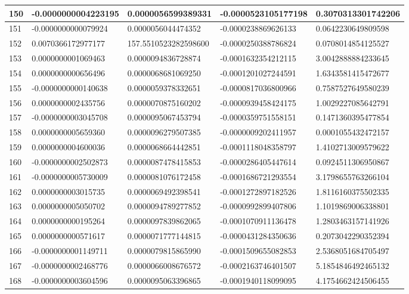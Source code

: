 \begin{center}
\begin{longtable}{|p{0.5cm}|p{3.5cm}|p{3.5cm}|p{3.5cm}|p{3.5cm}|}
\hline
150  & -0.0000000004223195  & 0.0000056599389331  & -0.0000523105177198  & 0.3070313301742206\\
\hline
151  & -0.0000000000079924  & 0.0000056044474352  & -0.0000238869626133  & 0.0642230649809598\\
\hline
152  & 0.0070366172977177  & 157.5510523282598600  & -0.0000250388786824  & 0.0708014854125527\\
\hline
153  & 0.0000000001069463  & 0.0000094836728874  & -0.0001632354212115  & 3.0042888884233645\\
\hline
154  & 0.0000000000656496  & 0.0000068681069250  & -0.0001201027244591  & 1.6343581415472677\\
\hline
155  & -0.0000000000140638  & 0.0000059378332651  & -0.0000817036800966  & 0.7587527649580239\\
\hline
156  & 0.0000000002435756  & 0.0000070875160202  & -0.0000939458424175  & 1.0029227085642791\\
\hline
157  & -0.0000000003045708  & 0.0000095067453794  & -0.0000359751558151  & 0.1471360395477854\\
\hline
158  & 0.0000000005659360  & 0.0000096279507385  & -0.0000009202411957  & 0.0001055432472157\\
\hline
159  & 0.0000000004600036  & 0.0000068664442851  & -0.0001118048358797  & 1.4102713009579622\\
\hline
160  & -0.0000000002502873  & 0.0000087478415853  & -0.0000286405447614  & 0.0924511306950867\\
\hline
161  & -0.0000000005730009  & 0.0000081076172458  & -0.0001686721293554  & 3.1798655763266104\\
\hline
162  & 0.0000000003015735  & 0.0000069492398541  & -0.0001272897182526  & 1.8116160375502335\\
\hline
163  & 0.0000000005050702  & 0.0000094789277852  & -0.0000992899407806  & 1.1019869006338801\\
\hline
164  & 0.0000000000195264  & 0.0000097839862065  & -0.0001070911136478  & 1.2803463157141926\\
\hline
165  & 0.0000000000571617  & 0.0000071777144815  & -0.0000431284350636  & 0.2073042290352394\\
\hline
166  & -0.0000000001149711  & 0.0000079815865990  & -0.0001509655082853  & 2.5368051684705497\\
\hline
167  & -0.0000000002468776  & 0.0000066008676572  & -0.0002163746401507  & 5.1854846492465132\\
\hline
168  & -0.0000000003604596  & 0.0000095063396865  & -0.0001940118099095  & 4.1754662424506455\\

\end{longtable}
\end{center}
